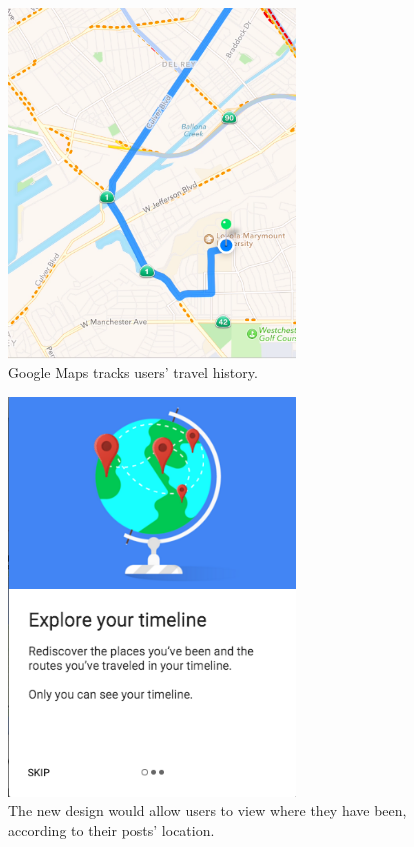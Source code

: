 \documentclass[11pt]{article}
\begin{document}
\begin{figure}[ht]
\centering
\includegraphics[width=3in]{images/gps.png}
\caption{Google Maps tracks users' travel history.}
\label{travel_history}
\end{figure}

\begin{figure}[ht]
\centering
\includegraphics[width=3in]{images/view_your_timeline_prompt.png}
\caption{The new design would allow users to view where they have been, according to their posts' location.}
\label{view_timeline}
\end{figure}
\end{document}
